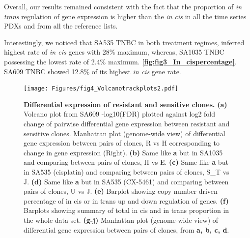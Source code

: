  Overall, our results remained consistent with the fact that the proportion of \textit{in trans} regulation of gene expression is higher than the \textit{in cis} in all the time series PDXs and from all the reference lists.   
 
 Interestingly, we noticed that SA535 TNBC in both treatment regimes, inferred highest rate of \textit{in cis} genes with 28\% maximum, whereas, SA1035 TNBC possessing the lowest rate of 2.4\% maximum. 
\textbf{\autoref{fig:fig3_In_cispercentage}}. SA609 TNBC showed 12.8\% of its highest \textit{in cis} gene rate.


\begin{figure}
\centering
  \texttt{[image: Figures/fig4\_Volcanotrackplots2.pdf]}
\caption[DE of resistant and sensitive clonealign defined clones]
	{\small
	\textbf{Differential expression of resistant and sensitive clones.}
	\textbf{(a)} Volcano plot from SA609 -log10(FDR) plotted against log2 fold change of pairwise differential gene expression between resistant and sensitive clones. Manhattan plot (genome-wide view) of differential gene expression between pairs of clones, R vs H corresponding to change in gene expression (Right).
	    \textbf{(b)} Same like \textbf{a} but in SA1035 and comparing between pairs of clones, H vs E. 
	     \textbf{(c)} Same like \textbf{a} but in SA535 (cisplatin) and comparing between pairs of clones, S\_T vs J. 
	     \textbf{(d)} Same like \textbf{a} but in SA535 (CX-5461) and comparing between pairs of clones, U vs J.
	   \textbf{(e)} Barplot showing copy number driven percentage of in cis or in trans up and down regulation of genes.
	   \textbf{(f)} Barplots showing summary of total in cis and in trans proportion in the whole data set.
	     \textbf{(g-j)} Manhattan plot (genome-wide view) of differential gene expression between pairs of clones, from \textbf{a, b, c, d}. }
	\label{fig:fig4_Volcanotrackplots2}
\end{figure}



